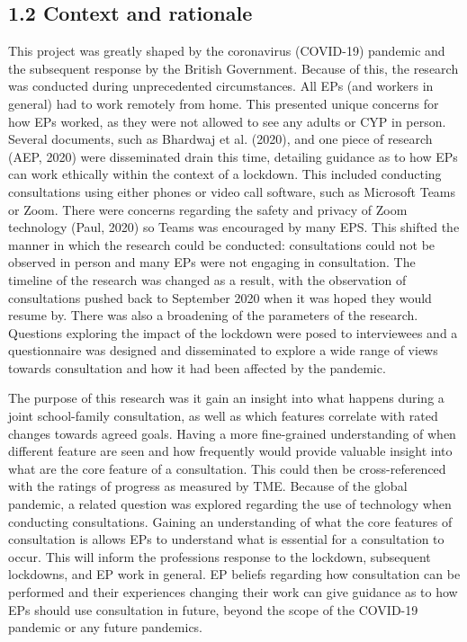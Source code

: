 \documentclass[
  english,
  man]{apa}
\begin{document}
\hypertarget{context-and-rationale}{%
\subsection{1.2 Context and rationale}\label{context-and-rationale}}

This project was greatly shaped by the coronavirus (COVID-19) pandemic and the subsequent response by the British Government. Because of this, the research was conducted during unprecedented circumstances. All EPs (and workers in general) had to work remotely from home. This presented unique concerns for how EPs worked, as they were not allowed to see any adults or CYP in person. Several documents, such as Bhardwaj et al. (2020), and one piece of research (AEP, 2020) were disseminated drain this time, detailing guidance as to how EPs can work ethically within the context of a lockdown. This included conducting consultations using either phones or video call software, such as Microsoft Teams or Zoom. There were concerns regarding the safety and privacy of Zoom technology (Paul, 2020) so Teams was encouraged by many EPS. This shifted the manner in which the research could be conducted: consultations could not be observed in person and many EPs were not engaging in consultation. The timeline of the research was changed as a result, with the observation of consultations pushed back to September 2020 when it was hoped they would resume by. There was also a broadening of the parameters of the research. Questions exploring the impact of the lockdown were posed to interviewees and a questionnaire was designed and disseminated to explore a wide range of views towards consultation and how it had been affected by the pandemic.

The purpose of this research was it gain an insight into what happens during a joint school-family consultation, as well as which features correlate with rated changes towards agreed goals. Having a more fine-grained understanding of when different feature are seen and how frequently would provide valuable insight into what are the core feature of a consultation. This could then be cross-referenced with the ratings of progress as measured by TME. Because of the global pandemic, a related question was explored regarding the use of technology when conducting consultations. Gaining an understanding of what the core features of consultation is allows EPs to understand what is essential for a consultation to occur. This will inform the professions response to the lockdown, subsequent lockdowns, and EP work in general. EP beliefs regarding how consultation can be performed and their experiences changing their work can give guidance as to how EPs should use consultation in future, beyond the scope of the COVID-19 pandemic or any future pandemics.
\end{document}
